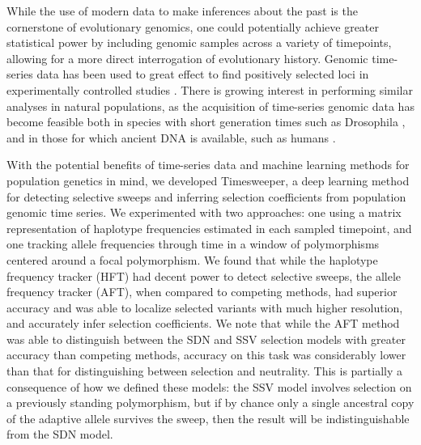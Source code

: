 While the use of modern data to make inferences about the past is the cornerstone of evolutionary genomics, one could potentially achieve greater statistical power by including genomic samples across a variety of timepoints, allowing for a more direct interrogation of evolutionary history. Genomic time-series data has been used to great effect to find positively selected loci in experimentally controlled studies \cite{schlottererCombiningExperimentalEvolution2015}. There is growing interest in performing similar analyses in natural populations, as the acquisition of time-series genomic data has become feasible both in species with short generation times such as Drosophila \cite{berglandGenomicEvidenceRapid2014,kapunDrosophilaEvolutionSpace2021,langePopulationGenomicAssessment2022,machadoBroadGeographicSampling2021}, and in those for which ancient DNA is available, such as humans \cite{allentoftPopulationGenomicsStone2022}.

With the potential benefits of time-series data and machine learning methods for population genetics in mind, we developed Timesweeper, a deep learning method for detecting selective sweeps and inferring selection coefficients from population genomic time series. We experimented with two approaches: one using a matrix representation of haplotype frequencies estimated in each sampled timepoint, and one tracking allele frequencies through time in a window of polymorphisms centered around a focal polymorphism. We found that while the haplotype frequency tracker (HFT) had decent power to detect selective sweeps, the allele frequency tracker (AFT), when compared to competing methods, had superior accuracy and was able to localize selected variants with much higher resolution, and accurately infer selection coefficients. We note that while the AFT method was able to distinguish between the SDN and SSV selection models with greater accuracy than competing methods, accuracy on this task was considerably lower than that for distinguishing between selection and neutrality. This is partially a consequence of how we defined these models: the SSV model involves selection on a previously standing polymorphism, but if by chance only a single ancestral copy of the adaptive allele survives the sweep, then the result will be indistinguishable from the SDN model.


